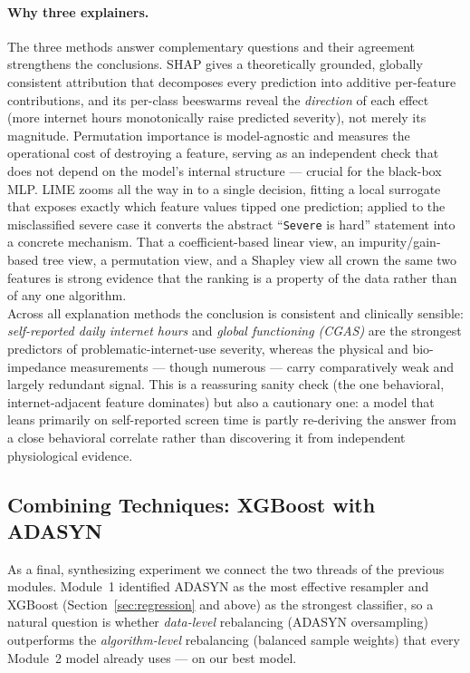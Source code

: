 \paragraph{Why three explainers.} The three methods answer complementary questions and their agreement strengthens the conclusions. SHAP gives a theoretically grounded, globally consistent attribution that decomposes every prediction into additive per-feature contributions, and its per-class beeswarms reveal the \emph{direction} of each effect (more internet hours monotonically raise predicted severity), not merely its magnitude. Permutation importance is model-agnostic and measures the operational cost of destroying a feature, serving as an independent check that does not depend on the model's internal structure --- crucial for the black-box MLP. LIME zooms all the way in to a single decision, fitting a local surrogate that exposes exactly which feature values tipped one prediction; applied to the misclassified severe case it converts the abstract ``\texttt{Severe} is hard'' statement into a concrete mechanism. That a coefficient-based linear view, an impurity/gain-based tree view, a permutation view, and a Shapley view all crown the same two features is strong evidence that the ranking is a property of the data rather than of any one algorithm.\\

Across all explanation methods the conclusion is consistent and clinically sensible: \emph{self-reported daily internet hours} and \emph{global functioning (CGAS)} are the strongest predictors of problematic-internet-use severity, whereas the physical and bio-impedance measurements --- though numerous --- carry comparatively weak and largely redundant signal. This is a reassuring sanity check (the one behavioral, internet-adjacent feature dominates) but also a cautionary one: a model that leans primarily on self-reported screen time is partly re-deriving the answer from a close behavioral correlate rather than discovering it from independent physiological evidence.

\subsection{Combining Techniques: XGBoost with ADASYN}
As a final, synthesizing experiment we connect the two threads of the previous modules. Module~1 identified ADASYN as the most effective resampler and XGBoost (Section~\ref{sec:regression} and above) as the strongest classifier, so a natural question is whether \emph{data-level} rebalancing (ADASYN oversampling) outperforms the \emph{algorithm-level} rebalancing (balanced sample weights) that every Module~2 model already uses --- on our best model.

